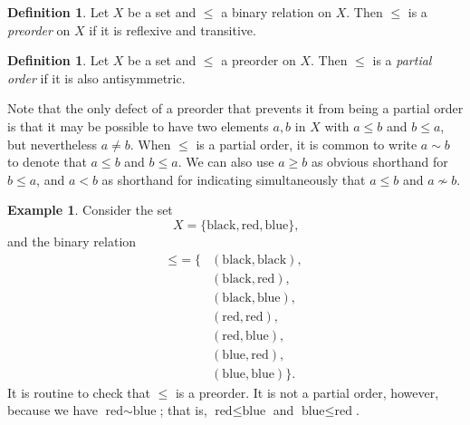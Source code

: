 \documentclass[letterpaper]{article}
\theoremstyle{definition}
\newtheorem{definition}[theorem]{Definition}
\newtheorem{example}[theorem]{Example}
\begin{document}
\begin{definition}
  \label{def:preorder}
  Let \(X\) be a set and \(\leq\) a binary relation on \(X\).  Then
  \(\leq\) is a \emph{preorder} on \(X\) if it is reflexive and
  transitive.
\end{definition}

\begin{definition}
  \label{def:partialorder}
  Let \(X\) be a set and \(\leq\) a preorder on \(X\).  Then \(\leq\)
  is a \emph{partial order} if it is also antisymmetric.
\end{definition}

Note that the only defect of a preorder that prevents it from being a
partial order is that it may be possible to have two elements \(a,b\)
in \(X\) with \(a \leq b\) and \(b \leq a\), but nevertheless \(a \neq
b\).  When \(\leq\) is a partial order, it is common to write \(a \sim
b\) to denote that \(a \leq b\) and \(b \leq a\).  We can also use \(a
\geq b\) as obvious shorthand for \(b \leq a\), and \(a < b\) as
shorthand for indicating simultaneously that \(a \leq b\) and \(a
\not\sim b\).

\begin{example}
  \label{example:prenotpartial}
  Consider the set
  \[X = \{\text{black}, \text{red}, \text{blue}\}\text{,}\]
  and the binary relation
  \begin{align*}
    \mathord{\leq} = \{
    &(\text{black}, \text{black}), \\
    &(\text{black}, \text{red}), \\
    &(\text{black}, \text{blue}), \\
    &(\text{red}, \text{red}), \\
    &(\text{red}, \text{blue}), \\
    &(\text{blue}, \text{red}), \\
    &(\text{blue}, \text{blue})
    \} \text{.}
  \end{align*}
  It is routine to check that \(\leq\) is a preorder.  It is not a
  partial order, however, because we have \(\text{red} \sim
  \text{blue}\); that is, \(\text{red} \leq \text{blue}\) and
  \(\text{blue} \leq \text{red}\).
\end{example}
\end{document}
